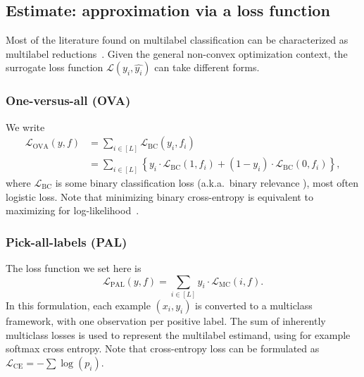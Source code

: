 \subsection{Estimate: approximation via a loss function}
\label{section:background:estimate}


Most of the literature found on multilabel classification can be characterized as multilabel reductions~\cite{multilabelReduction}. Given the general non-convex optimization context, the surrogate loss function $\mathcal{L}(y_i, \hat{y_i})$ can take different forms. 

\subsubsection*{One-versus-all (OVA)}
We write
%
\begin{equation}
\begin{aligned}
\mathcal{L}_{\mathrm{OVA}}(y, f) &= \sum_{i \in[L]} \mathcal{L}_{\mathrm{BC}}\left(y_{i}, f_{i}\right)\\
&=\sum_{i \in[L]}\left\{y_{i} \cdot \mathcal{L}_{\mathrm{BC}}\left(1, f_{i}\right)+\left(1-y_{i}\right) \cdot \mathcal{L}_{\mathrm{BC}}\left(0, f_{i}\right)\right\},
\end{aligned}
\end{equation}
%
where $\mathcal{L}_{\mathrm{BC}}$ is some binary classification loss (a.k.a.\ binary relevance \cite{OVA1, hammingLoss, OVA2}), most often logistic loss.  Note that minimizing binary cross-entropy is equivalent to maximizing for log-likelihood~\cite[Section 4.3.4]{Bishop}.

\subsubsection*{Pick-all-labels (PAL)}
The loss function we set here is
%
\begin{equation}
\mathcal{L}_{\mathrm{PAL}}(y, f) = \sum_{i \in[L]} y_{i} \cdot \mathcal{L}_{\mathrm{MC}}(i, f).
\end{equation}
%
In this formulation, each example $(x_i, y_i)$ is converted to a multiclass framework, with one observation per positive label. The sum of inherently multiclass losses is used to represent the multilabel estimand, using for example softmax cross entropy. Note that cross-entropy loss can be formulated as \(\mathcal{L}_{\text {CE}}=-\sum \log \left(p_{i}\right)\).

